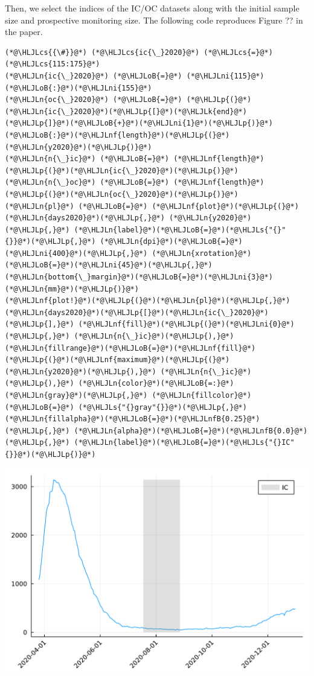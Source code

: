 \documentclass[12pt,a4paper]{article}
\newcommand{\HLJLk}[1]{\textcolor[RGB]{148,91,176}{\textbf{#1}}}
\newcommand{\HLJLn}[1]{#1}
\newcommand{\HLJLnf}[1]{\textcolor[RGB]{66,102,213}{#1}}
\newcommand{\HLJLs}[1]{\textcolor[RGB]{201,61,57}{#1}}
\newcommand{\HLJLnfB}[1]{\textcolor[RGB]{59,151,46}{#1}}
\newcommand{\HLJLni}[1]{\textcolor[RGB]{59,151,46}{#1}}
\newcommand{\HLJLoB}[1]{\textcolor[RGB]{102,102,102}{\textbf{#1}}}
\newcommand{\HLJLp}[1]{#1}
\newcommand{\HLJLcs}[1]{\textcolor[RGB]{153,153,119}{\textit{#1}}}
\begin{document}
Then, we select the indices of the IC/OC datasets along with the initial sample size and prospective monitoring size. The following code reproduces Figure ?? in the paper.


\begin{lstlisting}
(*@\HLJLcs{{\#}}@*) (*@\HLJLcs{ic{\_}2020}@*) (*@\HLJLcs{=}@*) (*@\HLJLcs{115:175}@*)
(*@\HLJLn{ic{\_}2020}@*) (*@\HLJLoB{=}@*) (*@\HLJLni{115}@*)(*@\HLJLoB{:}@*)(*@\HLJLni{155}@*)
(*@\HLJLn{oc{\_}2020}@*) (*@\HLJLoB{=}@*) (*@\HLJLp{(}@*)(*@\HLJLn{ic{\_}2020}@*)(*@\HLJLp{[}@*)(*@\HLJLk{end}@*)(*@\HLJLp{]}@*)(*@\HLJLoB{+}@*)(*@\HLJLni{1}@*)(*@\HLJLp{)}@*)(*@\HLJLoB{:}@*)(*@\HLJLnf{length}@*)(*@\HLJLp{(}@*)(*@\HLJLn{y2020}@*)(*@\HLJLp{)}@*)
(*@\HLJLn{n{\_}ic}@*) (*@\HLJLoB{=}@*) (*@\HLJLnf{length}@*)(*@\HLJLp{(}@*)(*@\HLJLn{ic{\_}2020}@*)(*@\HLJLp{)}@*)
(*@\HLJLn{n{\_}oc}@*) (*@\HLJLoB{=}@*) (*@\HLJLnf{length}@*)(*@\HLJLp{(}@*)(*@\HLJLn{oc{\_}2020}@*)(*@\HLJLp{)}@*)
(*@\HLJLn{pl}@*) (*@\HLJLoB{=}@*) (*@\HLJLnf{plot}@*)(*@\HLJLp{(}@*)(*@\HLJLn{days2020}@*)(*@\HLJLp{,}@*) (*@\HLJLn{y2020}@*)(*@\HLJLp{,}@*) (*@\HLJLn{label}@*)(*@\HLJLoB{=}@*)(*@\HLJLs{"{}"{}}@*)(*@\HLJLp{,}@*) (*@\HLJLn{dpi}@*)(*@\HLJLoB{=}@*)(*@\HLJLni{400}@*)(*@\HLJLp{,}@*) (*@\HLJLn{xrotation}@*)(*@\HLJLoB{=}@*)(*@\HLJLni{45}@*)(*@\HLJLp{,}@*) (*@\HLJLn{bottom{\_}margin}@*)(*@\HLJLoB{=}@*)(*@\HLJLni{3}@*)(*@\HLJLn{mm}@*)(*@\HLJLp{)}@*)
(*@\HLJLnf{plot!}@*)(*@\HLJLp{(}@*)(*@\HLJLn{pl}@*)(*@\HLJLp{,}@*) (*@\HLJLn{days2020}@*)(*@\HLJLp{[}@*)(*@\HLJLn{ic{\_}2020}@*)(*@\HLJLp{],}@*) (*@\HLJLnf{fill}@*)(*@\HLJLp{(}@*)(*@\HLJLni{0}@*)(*@\HLJLp{,}@*) (*@\HLJLn{n{\_}ic}@*)(*@\HLJLp{),}@*) (*@\HLJLn{fillrange}@*)(*@\HLJLoB{=}@*)(*@\HLJLnf{fill}@*)(*@\HLJLp{(}@*)(*@\HLJLnf{maximum}@*)(*@\HLJLp{(}@*)(*@\HLJLn{y2020}@*)(*@\HLJLp{),}@*) (*@\HLJLn{n{\_}ic}@*)(*@\HLJLp{),}@*) (*@\HLJLn{color}@*)(*@\HLJLoB{=:}@*)(*@\HLJLn{gray}@*)(*@\HLJLp{,}@*) (*@\HLJLn{fillcolor}@*) (*@\HLJLoB{=}@*) (*@\HLJLs{"{}gray"{}}@*)(*@\HLJLp{,}@*) (*@\HLJLn{fillalpha}@*)(*@\HLJLoB{=}@*)(*@\HLJLnfB{0.25}@*)(*@\HLJLp{,}@*) (*@\HLJLn{alpha}@*)(*@\HLJLoB{=}@*)(*@\HLJLnfB{0.0}@*)(*@\HLJLp{,}@*) (*@\HLJLn{label}@*)(*@\HLJLoB{=}@*)(*@\HLJLs{"{}IC"{}}@*)(*@\HLJLp{)}@*)
\end{lstlisting}

\includegraphics[width=\linewidth]{figures/admissionsICU_5_1.pdf}
\end{document}
